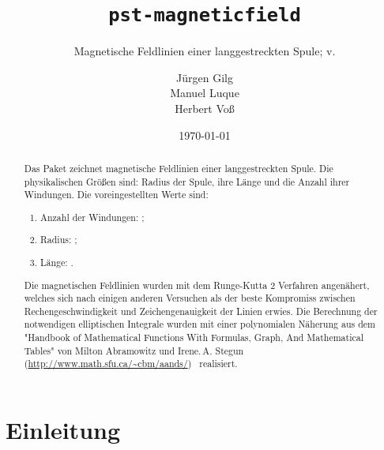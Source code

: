 \documentclass[11pt,english,BCOR10mm,DIV12,bibliography=totoc,parskip=false,smallheadings
    headexclude,footexclude,oneside]{pst-doc}
\let\pstMFfv\fileversion
\begin{document}
\title{\texttt{pst-magneticfield}}
\subtitle{Magnetische Feldlinien einer langgestreckten Spule; v.\pstMFfv}
\author{J\"{u}rgen Gilg\\ Manuel Luque\\Herbert Vo\ss}
\date{\today}
\maketitle


\clearpage%
\begin{abstract}
Das Paket  zeichnet magnetische Feldlinien einer langgestreckten Spule. 
Die physikalischen Gr\"{o}{\ss}en sind: Radius der Spule, ihre L\"{a}nge und die Anzahl ihrer 
Windungen. Die voreingestellten Werte sind:

\begin{enumerate}
  \item Anzahl der Windungen: ;
  \item Radius: ;
  \item L\"{a}nge: .
\end{enumerate}

Die magnetischen Feldlinien wurden mit dem Runge-Kutta 2 Verfahren angen\"{a}hert, welches sich 
nach einigen anderen Versuchen als der beste Kompromiss zwischen Re\-chen\-ge\-schwin\-dig\-keit und 
Zeichengenauigkeit der Linien erwies. Die Berechnung der notwendigen elliptischen Integrale 
wurden mit einer polynomialen N\"{a}herung aus dem  "Handbook of Mathematical Functions 
With Formulas, Graph, And Mathematical Tables" von Milton Abramowitz und Irene.\,A. Stegun 
(\url{http://www.math.sfu.ca/~cbm/aands/})~\cite{abramowitz} realisiert.
\end{abstract}

\clearpage
\tableofcontents

\clearpage
\section{Einleitung}
\end{document}
